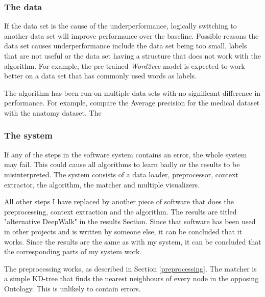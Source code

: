 \documentclass{article}
\begin{document}
  \subsubsection{The data}
  If the data set is the cause of the underperformance, logically switching to another data set will improve performance over the baseline. Possible reasons the data set causes underperformance include the data set being too small, labels that are not useful or the data set having a structure that does not work with the algorithm. For example, the pre-trained \emph{Word2vec} model is expected to work better on a data set that has commonly used words as labels. %
  
 The algorithm has been run on multiple data sets with no significant difference in performance. For example, compare the Average precision for the medical dataset with the anatomy dataset. The %
 
  \subsubsection{The system}
  If any of the steps in the software system contains an error, the whole system may fail. This could cause all algorithms to learn badly or the results to be misinterpreted. The system consists of a data loader, preprocessor, context extractor, the algorithm, the matcher and multiple visualizers. 
  
  All other steps I have replaced by another piece of software that does the preprocessing, context extraction and the algorithm. The results are titled "alternative DeepWalk" in the results Section. Since that software has been used in other projects and is written by someone else, it can be concluded that it works. Since the results are the same as with my system, it can be concluded that the corresponding parts of my system work.
  
  The preprocessing works, as described in Section \ref{preprocessing}.  The matcher is a simple KD-tree that finds the nearest neighbours of every node in the opposing Ontology. This is unlikely to contain errors.
  
\end{document}
